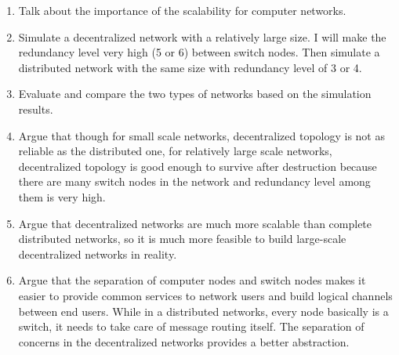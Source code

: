 \documentclass[11pt]{article}
\begin{document}
\begin{enumerate}[nolistsep]
\item Talk about the importance of the scalability for computer
  networks.
\item Simulate a decentralized network with a relatively large size. I
  will make the redundancy level very high (5 or 6) between switch
  nodes. Then simulate a distributed network with the same size with
  redundancy level of 3 or 4.
\item Evaluate and compare the two types of networks based on the
  simulation results.
\item Argue that though for small scale networks,
  decentralized topology is not as reliable as the distributed one, for
  relatively large scale networks, decentralized topology is good
  enough to survive after destruction because there are many switch
  nodes in the network and redundancy level among them is very high.
\item Argue that decentralized networks are much more scalable than
  complete distributed networks, so it is much more feasible to build
  large-scale decentralized networks in reality.
\item Argue that the separation of computer nodes and switch nodes
  makes it easier to provide common services to network users and
  build logical channels between end users. While in a distributed
  networks, every node basically is a switch, it needs to take
  care of message routing itself. The separation of concerns in the
  decentralized networks provides a better abstraction.
\end{enumerate}
\end{document}
